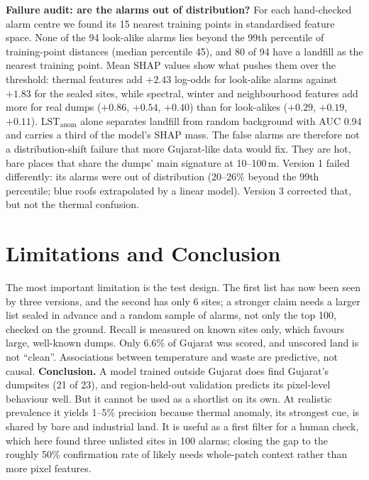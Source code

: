 \documentclass{article}
\begin{document}
\textbf{Failure audit: are the alarms out of distribution?} For each hand-checked alarm centre we found its 15 nearest training points in standardised feature space. None of the 94 look-alike alarms lies beyond the 99th percentile of training-point distances (median percentile 45), and 80 of 94 have a landfill as the nearest training point. Mean SHAP values \citep{lundberg2017} show what pushes them over the threshold: thermal features add $+2.43$ log-odds for look-alike alarms against $+1.83$ for the sealed sites, while spectral, winter and neighbourhood features add more for real dumps ($+0.86$, $+0.54$, $+0.40$) than for look-alikes ($+0.29$, $+0.19$, $+0.11$). $\mathrm{LST_{anom}}$ alone separates landfill from random background with AUC 0.94 and carries a third of the model's SHAP mass. The false alarms are therefore not a distribution-shift failure that more Gujarat-like data would fix. They are hot, bare places that share the dumps' main signature at 10--100\,m. Version 1 failed differently: its alarms were out of distribution (20--26\% beyond the 99th percentile; blue roofs extrapolated by a linear model). Version 3 corrected that, but not the thermal confusion.

\section{Limitations and Conclusion}
The most important limitation is the test design. The first list has now been seen by three versions, and the second has only 6 sites; a stronger claim needs a larger list sealed in advance and a random sample of alarms, not only the top 100, checked on the ground. Recall is measured on known sites only, which favours large, well-known dumps. Only 6.6\% of Gujarat was scored, and unscored land is not ``clean''. Associations between temperature and waste are predictive, not causal. \textbf{Conclusion.} A model trained outside Gujarat does find Gujarat's dumpsites (21 of 23), and region-held-out validation predicts its pixel-level behaviour well. But it cannot be used as a shortlist on its own. At realistic prevalence it yields 1--5\% precision because thermal anomaly, its strongest cue, is shared by bare and industrial land. It is useful as a first filter for a human check, which here found three unlisted sites in 100 alarms; closing the gap to the roughly 50\% confirmation rate of \citet{kruse2023} likely needs whole-patch context rather than more pixel features.
\end{document}
